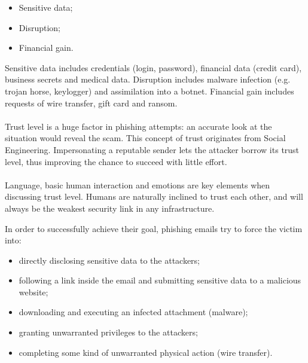 \documentclass[a4paper]{article}
\begin{document}
\begin{itemize}
    \item Sensitive data;
    \item Disruption;
    \item Financial gain.
\end{itemize}

Sensitive data includes credentials (login, password), financial data (credit card), business secrets and medical data. Disruption includes malware infection (e.g. trojan horse, keylogger) and assimilation into a botnet. Financial gain includes requests of wire transfer, gift card and ransom.
\\ \\
Trust level is a huge factor in phishing attempts: an accurate look at the situation would reveal the scam. This concept of trust originates from Social Engineering. Impersonating a reputable sender lets the attacker borrow its trust level, thus improving the chance to succeed with little effort. 
\\ \\
Language, basic human interaction and emotions are key elements when discussing trust level. Humans are naturally inclined to trust each other, and will always be the weakest security link in any infrastructure.

\newpage

\noindent
In order to successfully achieve their goal, phishing emails try to force the victim into:

\begin{itemize}
    \item directly disclosing sensitive data to the attackers;
    \item following a link inside the email and submitting sensitive data to a malicious website;
    \item downloading and executing an infected attachment (malware);
    \item granting unwarranted privileges to the attackers;
    \item completing some kind of unwarranted physical action (wire transfer).
\end{itemize}
\end{document}
